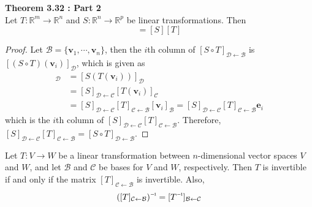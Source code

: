 \textbf{Theorem 3.32 : Part 2} \\

 Let $T: \mathbb{R}^m \rightarrow \mathbb{R}^n$ and $S: \mathbb{R}^n \rightarrow \mathbb{R}^p$ be linear transformations. Then \begin{equation*}
	[S \circ T] = [S][T]
\end{equation*}

\begin{proof}
	Let $\mathcal{B} = \{\textbf{v}_1, \cdots, \textbf{v}_n\}$, then the $i$th column of $[S \circ T]_{ \mathcal{D} \leftarrow \mathcal{B} }$ is $[(S \circ T)(\textbf{v}_i)]_\mathcal{D}$, which is given as \begin{align*}
		[(S \circ T)(\textbf{v}_i)]_\mathcal{D} &= [S(T(\textbf{v}_i))]_\mathcal{D} \\
		&= [S]_{\mathcal{D} \leftarrow \mathcal{C}}[T(\textbf{v}_i)]_\mathcal{C} \\
		&= [S]_{\mathcal{D} \leftarrow \mathcal{C}}[T]_{\mathcal{C} \leftarrow \mathcal{B}}[\textbf{v}_i]_\mathcal{B} = [S]_{\mathcal{D} \leftarrow \mathcal{C}}[T]_{\mathcal{C} \leftarrow \mathcal{B}}\textbf{e}_i
	\end{align*} which is the $i$th column of $[S]_{\mathcal{D} \leftarrow \mathcal{C}}[T]_{\mathcal{C} \leftarrow \mathcal{B}}$. Therefore, $[S]_{\mathcal{D} \leftarrow \mathcal{C}}[T]_{\mathcal{C} \leftarrow \mathcal{B}} = [S \circ T]_{\mathcal{D} \leftarrow \mathcal{B}}$.
\end{proof}

\begin{theorem}
	Let $T: V \rightarrow W$ be a linear transformation between $n$-dimensional vector spaces $V$ and $W$, and let $\mathcal{B}$ and $\mathcal{C}$ be bases for $V$ and $W$, respectively. Then $T$ is invertible if and only if the matrix $[T]_{ \mathcal{C} \leftarrow \mathcal{B} }$ is invertible. Also, \begin{equation*}
		\inv{([T]_{ \mathcal{C} \leftarrow \mathcal{B} })} = [\inv{T}]_{ \mathcal{B} \leftarrow \mathcal{C} }
	\end{equation*}
\end{theorem}

